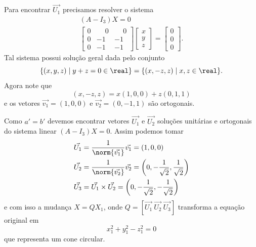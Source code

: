 \begin{exemplos}
\begin{enumerate}
\begin{solucao}
                  Para encontrar $\vec{U_1}$ precisamos resolver o sistema
                  \begin{align*}
                      (A - I_3)X = 0 \\
                      \begin{bmatrix}
                          0 & \phantom{-}0 & \phantom{-}0 \\
                          0 & -1           & -1           \\
                          0 & -1           & -1
                      \end{bmatrix} \begin{bmatrix}
                                        x \\ y\\ z
                                    \end{bmatrix} = \begin{bmatrix}
                                                        0 \\ 0\\ 0
                                                    \end{bmatrix}.
                  \end{align*}
                  Tal sistema possui solução geral dada pelo conjunto
                  \[
                      \{(x, y, z) \mid y + z = 0 \in \real\} = \{(x, -z, z) \mid x, z \in \real\}.
                  \]
                  Agora note que
                  \[
                      (x, -z, z) = x(1, 0, 0) + z(0, 1, 1)
                  \]
                  e os vetores $\vec{v_1} = (1,0,0)$ e $\vec{v_2} = (0,-1,1)$ são ortogonais.

                  Como $a' = b'$ devemos encontrar vetores $\vec{U_1}$ e $\vec{U_2}$ soluções unitárias e ortogonais do sistema linear $(A -I_3)X = 0$. Assim podemos tomar
                  \begin{align*}
                      \vec{U_1} & = \dfrac{1}{\norm{\vec{v_1}}}\vec{v_1} = (1,0,0)                                                 \\
                      \vec{U_2} & = \dfrac{1}{\norm{\vec{v_2}}}\vec{v_2} = \left(0,-\dfrac{1}{\sqrt{2}},\dfrac{1}{\sqrt{2}}\right) \\
                      \vec{U_3} & = \vec{U_1}\times\vec{U_2} = \left(0,-\dfrac{1}{\sqrt{2}},-\dfrac{1}{\sqrt{2}}\right)
                  \end{align*}
                  e com  isso a mudança $X = QX_1$, onde $Q = [\vec{U_1}\ \vec{U_2}\ \vec{U_3}]$ transforma a equação original em
                  \[
                      x_1^2 + y_1^2 - z_1^2 = 0
                  \]
                  que representa um cone circular.
              \end{solucao}


\end{enumerate}
\end{exemplos}
